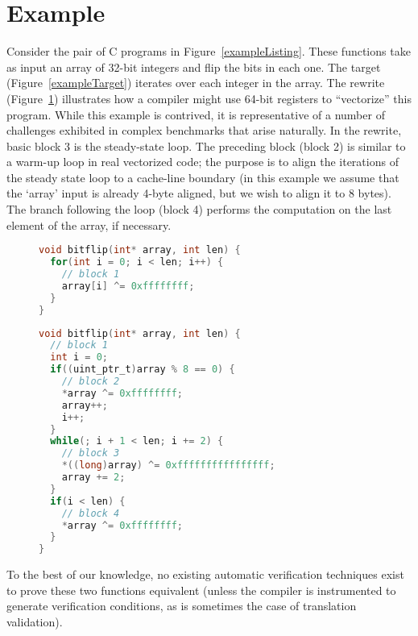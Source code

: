 \section{Example}\label{example-sec}

Consider the pair of C programs in Figure~\ref{exampleListing}. These
functions take as input an array of 32-bit integers and flip the bits
in each one. The target (Figure~\ref{exampleTarget}) iterates over
each integer in the array. The rewrite (Figure~\ref{exampleRewrite})
illustrates how a compiler might use 64-bit registers to ``vectorize''
this program. While this example is contrived, it is representative
of a number of challenges exhibited in complex benchmarks that arise
naturally. In the rewrite, basic block 3 is the steady-state loop.
The preceding block (block 2) is similar to a warm-up loop in real
vectorized code; the purpose is to align the iterations of the steady
state loop to a cache-line boundary (in this example we assume that the `array'
input is already 4-byte aligned, but we wish to align it to 8 bytes). The
branch following the loop (block 4) performs the computation on the
last element of the array, if necessary.

\begin{figure}\label{exampleListing}
\begin{lstlisting}[language=C]
void bitflip(int* array, int len) {
  for(int i = 0; i < len; i++) {
    // block 1
    array[i] ^= 0xffffffff;
  }
}
\end{lstlisting}
\label{exampleTarget}
\begin{lstlisting}[language=C]
void bitflip(int* array, int len) {
  // block 1
  int i = 0;
  if((uint_ptr_t)array % 8 == 0) {
    // block 2
    *array ^= 0xffffffff;
    array++;
    i++;
  } 
  while(; i + 1 < len; i += 2) {
    // block 3
    *((long)array) ^= 0xffffffffffffffff;
    array += 2;
  }
  if(i < len) {
    // block 4
    *array ^= 0xffffffff;
  }
}
\end{lstlisting}
\label{exampleRewrite}
\end{figure}

To the best of our knowledge, no existing automatic verification
techniques exist to prove these two functions equivalent (unless the
compiler is instrumented to generate verification conditions, as is
sometimes the case of translation validation).

